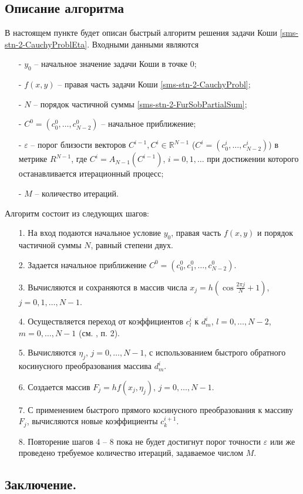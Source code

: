 \subsection{Описание алгоритма}
В настоящем пункте будет описан быстрый алгоритм решения задачи Коши \eqref{sms-stn-2-CauchyProblEta}. Входными данными являются
{
	\renewcommand{\labelitemi}{$\circ$}
	\begin{itemize}
		\item[-] $y_0$ -- начальное значение задачи Коши в точке 0;
		\item[-] $f(x,y)$ -- правая часть задачи Коши \eqref{sms-stn-2-CauchyProbl};
		\item[-] $N$  -- порядок частичной суммы \eqref{sms-stn-2-FurSobPartialSum};
		
		\item[-] $C^0=(c^0_0,\ldots,c^0_{N-2})$ -- начальное приближение;
		\item[-] $\varepsilon$ -- порог близости векторов $C^{i-1},C^i\in\mathbb{R}^{N-1}$ ($C^i=(c^i_0,\ldots,c^i_{N-2})$) в метрике $R^{N-1}$, где $C^i=A_{N-1}(C^{i-1})$, $i=0,1,\dots$ при достижении которого останавливается итерационный процесс;
		\item[-] $M$ -- количество итераций.
	\end{itemize}
}
Алгоритм состоит из следующих шагов:
\begin{enumerate}
	\item[1.] На вход подаются начальное условие $y_0$, правая часть $f(x,y)$ и порядок частичной суммы $N$, равный степени двух.
	\item[2.] Задается начальное приближение $C^0=(c_0^0,c_1^0,\ldots,c_{N-2}^0)$.
	\item[3.] Вычисляются и сохраняются в массив числа $x_j=h(\cos\frac{2\pi j}N+1)$, $j=0,1,\ldots,N-1$.
	\item[4.] Осуществляется переход от коэффициентов $c_l^i$ к $d_m^i$, $l=0,\ldots,N-2$, $m=0,\ldots,N-1$ (см. \cite{sms-stn-2-demiSMS_ShTN}, п. 2).
	\item[5.] Вычисляются $\eta_j$, $j=0,\ldots,N-1$, с использованием быстрого обратного косинусного преобразования массива $d_m^i$.
	\item[6.] Создается массив $F_j=hf(x_j,\eta_j)$, $j=0,\ldots,N-1$.
	\item[7.] С применением быстрого прямого косинусного преобразования к массиву $F_j$, вычисляются новые коэффициенты $c_k^{i+1}$.
	\item[8.] Повторение шагов 4 -- 8 пока не будет достигнут порог точности $\varepsilon$ или же проведено требуемое количество итераций, задаваемое числом $M$.
\end{enumerate}

\subsection{Заключение.}

